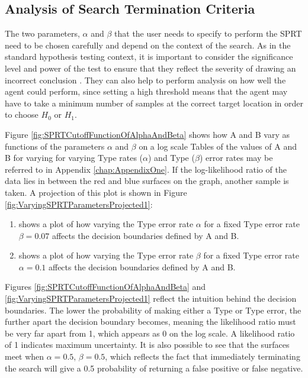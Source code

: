 \subsection{Analysis of Search Termination Criteria}
The two parameters, $\alpha$ and $\beta$ that the user needs to specify to perform the SPRT need to be chosen carefully and depend on the context of the search. As in the standard hypothesis testing context, it is important to consider the significance level and power of the test to ensure that they reflect the severity of drawing an incorrect conclusion \cite{IntroductionToMathematicalStatistics}. They can also help to perform analysis on how well the agent could perform, since setting a high threshold means that the agent may have to take a minimum number of samples at the correct target location in order to choose $H_0$ or $H_1$. \par

Figure \ref{fig:SPRTCutoffFunctionOfAlphaAndBeta} shows how A and B vary as functions of the parameters $\alpha$ and $\beta$ on a log scale
Tables of the values of A and B for varying for varying Type  rates ($\alpha$) and Type  ($\beta$) error rates may be referred to in Appendix \ref{chap:AppendixOne}.
If the log-likelihood ratio of the data lies in between the red and blue surfaces on the graph, another sample is taken. A projection of this plot is shown in Figure \ref{fig:VaryingSPRTParametersProjected1}:
\begin{enumerate}[label=(\alph*)]
    \item shows a plot of how varying the Type  error rate $\alpha$ for a fixed Type  error rate $\beta = 0.07$ affects the decision boundaries defined by A and B.
    \item shows a plot of how varying the Type  error rate $\beta$ for a fixed Type  error rate $\alpha = 0.1$ affects the decision boundaries defined by A and B.
\end{enumerate}

Figures \ref{fig:SPRTCutoffFunctionOfAlphaAndBeta} and \ref{fig:VaryingSPRTParametersProjected1} reflect the intuition behind the decision boundaries. The lower the probability of making either a Type  or Type  error, the further apart the decision boundary becomes, meaning the likelihood ratio must be very far apart from 1, which appears as 0 on the log scale. A likelihood ratio of 1 indicates maximum uncertainty. It is also possible to see that the surfaces meet when $\alpha=0.5$, $\beta=0.5$, which reflects the fact that immediately terminating the search will give a 0.5 probability of returning a false positive or false negative. \par

